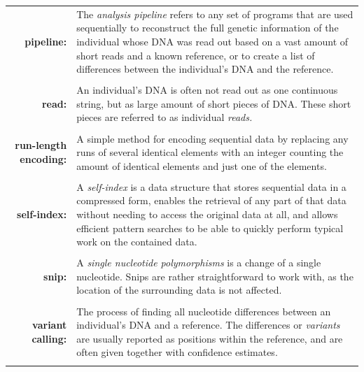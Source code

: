 \documentclass[a4paper,12pt,twoside,BCOR=10mm]{scrbook}
\begin{document}
\begin{tabular}{r p{12cm}}

\textbf{pipeline: } & 
The \textit{analysis pipeline} refers to any set of programs 
that are used sequentially to reconstruct the full genetic information 
of the individual whose DNA was read out based on a vast amount of short reads and a 
known reference, or to create a list of differences between the individual's DNA 
and the reference.
\\ \\

\textbf{read: } & 
An individual's DNA is often not read out as one continuous string, 
but as large amount of short pieces of DNA. 
These short pieces are referred to as individual \textit{reads.}
\\ \\

\textbf{run-length encoding:} &
A simple method for encoding sequential data by replacing any runs of several 
identical elements with an integer counting the amount of identical elements and 
just one of the elements.
\\ \\

\textbf{self-index:} & 
A \textit{self-index} is a data structure that 
stores sequential data in a compressed form, enables the retrieval of any part of that data without needing 
to access the original data at all, 
and allows efficient pattern searches to be able to quickly perform typical work on the contained data.
\\ \\

\textbf{snip:} &
A \textit{single nucleotide polymorphisms} is a change of a single nucleotide. 
Snips are rather straightforward to work with, as the location of the surrounding data is not affected.
\\ \\

\textbf{variant calling:} & 
The process of finding all nucleotide differences 
between an individual's DNA and a reference. The differences or \textit{variants} are usually reported as positions 
within the reference, and are often given together with confidence estimates.
\\ \\

\end{tabular}
\end{document}
